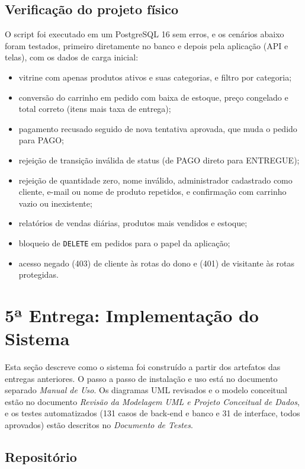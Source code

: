 \documentclass[12pt]{article}
\begin{document}
\subsection{Verificação do projeto físico}

O script foi executado em um PostgreSQL 16 sem erros, e os cenários abaixo foram testados, primeiro diretamente no banco e depois pela aplicação (API e telas), com os dados de carga inicial:

\begin{itemize}
\item vitrine com apenas produtos ativos e suas categorias, e filtro por categoria;
\item conversão do carrinho em pedido com baixa de estoque, preço congelado e total correto (itens mais taxa de entrega);
\item pagamento recusado seguido de nova tentativa aprovada, que muda o pedido para PAGO;
\item rejeição de transição inválida de status (de PAGO direto para ENTREGUE);
\item rejeição de quantidade zero, nome inválido, administrador cadastrado como cliente, e-mail ou nome de produto repetidos, e confirmação com carrinho vazio ou inexistente;
\item relatórios de vendas diárias, produtos mais vendidos e estoque;
\item bloqueio de \texttt{DELETE} em pedidos para o papel da aplicação;
\item acesso negado (403) de cliente às rotas do dono e (401) de visitante às rotas protegidas.
\end{itemize}

\newpage
\section{5ª Entrega: Implementação do Sistema}

Esta seção descreve como o sistema foi construído a partir dos artefatos das entregas anteriores. O passo a passo de instalação e uso está no documento separado \textit{Manual de Uso}. Os diagramas UML revisados e o modelo conceitual estão no documento \textit{Revisão da Modelagem UML e Projeto Conceitual de Dados}, e os testes automatizados (131 casos de back-end e banco e 31 de interface, todos aprovados) estão descritos no \textit{Documento de Testes}.

\subsection{Repositório}
\end{document}
